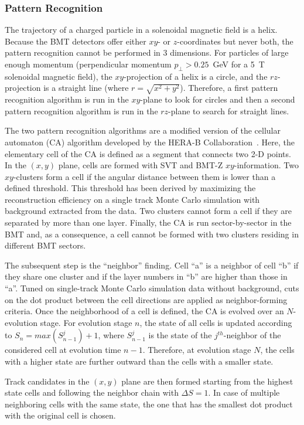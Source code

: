 \subsubsection{Pattern Recognition}

The trajectory of a charged particle in a solenoidal magnetic field is a helix. Because the BMT detectors offer
either $xy$- or $z$-coordinates but never both, the pattern recognition cannot be performed in 3 dimensions. For
particles of large enough momentum (perpendicular momentum $p_\perp > 0.25$~GeV for a 5~T solenoidal magnetic
field), the $xy$-projection of a helix is a circle, and the $rz$-projection is a straight line (where
$r = \sqrt{x^2 + y^2}$). Therefore, a first pattern recognition algorithm is run in the $xy$-plane to look for circles
and then a second pattern recognition algorithm is run in the $rz$-plane to search for straight lines.

The two pattern recognition algorithms are a modified version of the cellular automaton (CA) algorithm developed
by the HERA-B Collaboration~\cite{CA-HeraB}. Here, the elementary cell of the CA is defined as a segment that
connects two 2-D points. In the $(x,y)$ plane, cells are formed with SVT and BMT-Z $xy$-information. Two
$xy$-clusters form a cell if the angular distance between them is lower than a defined threshold. This threshold
has been derived by maximizing the reconstruction efficiency on a single track Monte Carlo simulation with
background extracted from the data. Two clusters cannot form a cell if they are separated by more than one layer.
Finally, the CA is run sector-by-sector in the BMT and, as a consequence, a cell cannot be formed with two clusters
residing in different BMT sectors.

The subsequent step is the ``neighbor'' finding. Cell ``a'' is a neighbor of cell ``b'' if they share one cluster and
if the layer numbers in ``b'' are higher than those in ``a''. Tuned on single-track Monte Carlo simulation data
without background, cuts on the dot product between the cell directions are applied as neighbor-forming criteria.
Once the neighborhood of a cell is defined, the CA is evolved over an $N$-evolution stage. For evolution stage $n$,
the state of all cells is updated according to $S_n = max(S_{n-1}^j) + 1$, where $S_{n-1}^j$ is the state of the
$j^{th}$-neighbor of the considered cell at evolution time $n-1$. Therefore, at evolution stage $N$, the cells with
a higher state are further outward than the cells with a smaller state.

Track candidates in the $(x,y)$ plane are then formed starting from the highest state cells and following the
neighbor chain with $\Delta S = 1$. In case of multiple neighboring cells with the same state, the one that has
the smallest dot product with the original cell is chosen.

